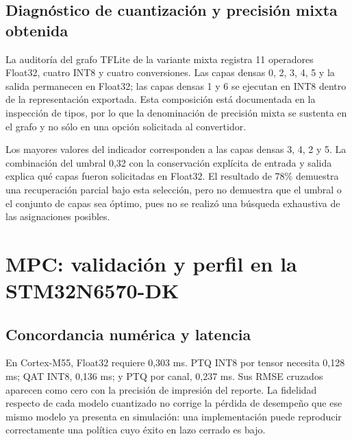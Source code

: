 \FloatBarrier
\subsection{Diagnóstico de cuantización y precisión mixta obtenida}
La auditoría del grafo TFLite de la variante mixta registra 11 operadores Float32, cuatro INT8 y cuatro conversiones. Las capas densas 0, 2, 3, 4, 5 y la salida permanecen en Float32; las capas densas 1 y 6 se ejecutan en INT8 dentro de la representación exportada. Esta composición está documentada en la inspección de tipos, por lo que la denominación de precisión mixta se sustenta en el grafo y no sólo en una opción solicitada al convertidor.

Los mayores valores del indicador corresponden a las capas densas 3, 4, 2 y 5. La combinación del umbral 0,32 con la conservación explícita de entrada y salida explica qué capas fueron solicitadas en Float32. El resultado de 78\% demuestra una recuperación parcial bajo esta selección, pero no demuestra que el umbral o el conjunto de capas sea óptimo, pues no se realizó una búsqueda exhaustiva de las asignaciones posibles.

\FloatBarrier
\section{MPC: validación y perfil en la STM32N6570-DK}
\FloatBarrier
\subsection{Concordancia numérica y latencia}


En Cortex-M55, Float32 requiere 0,303 ms. PTQ INT8 por tensor necesita 0,128 ms; QAT INT8, 0,136 ms; y PTQ por canal, 0,237 ms. Sus RMSE cruzados aparecen como cero con la precisión de impresión del reporte. La fidelidad respecto de cada modelo cuantizado no corrige la pérdida de desempeño que ese mismo modelo ya presenta en simulación: una implementación puede reproducir correctamente una política cuyo éxito en lazo cerrado es bajo.

